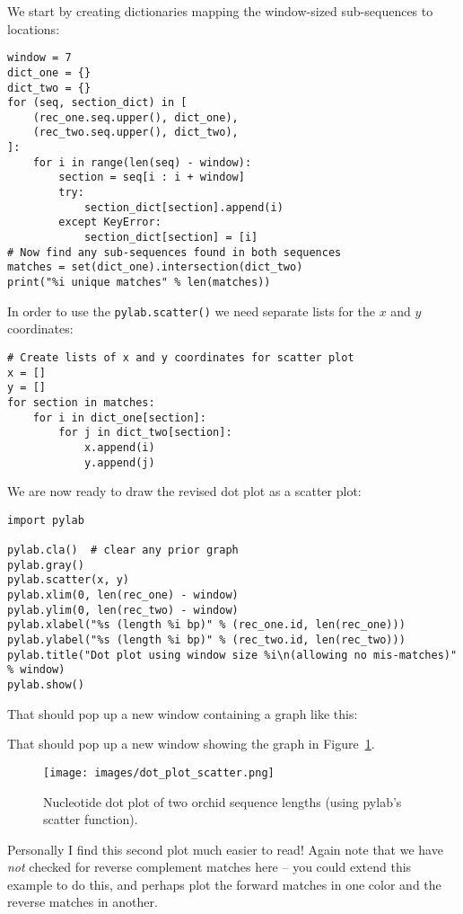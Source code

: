We start by creating dictionaries mapping the window-sized sub-sequences to locations:
\begin{verbatim}
window = 7
dict_one = {}
dict_two = {}
for (seq, section_dict) in [
    (rec_one.seq.upper(), dict_one),
    (rec_two.seq.upper(), dict_two),
]:
    for i in range(len(seq) - window):
        section = seq[i : i + window]
        try:
            section_dict[section].append(i)
        except KeyError:
            section_dict[section] = [i]
# Now find any sub-sequences found in both sequences
matches = set(dict_one).intersection(dict_two)
print("%i unique matches" % len(matches))
\end{verbatim}
\noindent In order to use the \verb|pylab.scatter()| we need separate lists for the $x$ and $y$ coordinates:
\begin{verbatim}
# Create lists of x and y coordinates for scatter plot
x = []
y = []
for section in matches:
    for i in dict_one[section]:
        for j in dict_two[section]:
            x.append(i)
            y.append(j)
\end{verbatim}
\noindent We are now ready to draw the revised dot plot as a scatter plot:
\begin{verbatim}
import pylab

pylab.cla()  # clear any prior graph
pylab.gray()
pylab.scatter(x, y)
pylab.xlim(0, len(rec_one) - window)
pylab.ylim(0, len(rec_two) - window)
pylab.xlabel("%s (length %i bp)" % (rec_one.id, len(rec_one)))
pylab.ylabel("%s (length %i bp)" % (rec_two.id, len(rec_two)))
pylab.title("Dot plot using window size %i\n(allowing no mis-matches)" % window)
pylab.show()
\end{verbatim}
%
%
\begin{htmlonly}
\noindent That should pop up a new window containing a graph like this:


\end{htmlonly}
\begin{latexonly}
\noindent That should pop up a new window showing the graph in Figure~\ref{fig:nuc-dot-plot-scatter}.
\begin{figure}[htbp]
\centering
\texttt{[image: images/dot\_plot\_scatter.png]}
\caption{Nucleotide dot plot of two orchid sequence lengths (using pylab's scatter function).}
\label{fig:nuc-dot-plot-scatter}
\end{figure}
\end{latexonly}
Personally I find this second plot much easier to read!
Again note that we have \emph{not} checked for reverse complement matches here
-- you could extend this example to do this, and perhaps plot the forward
matches in one color and the reverse matches in another.

